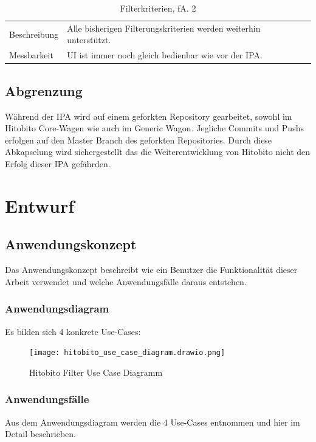 \begin{table}[h!]
   \begin{tabular}{|L{0.3\textwidth}|L{0.6\textwidth}|}
       \hline
         \\[4pt]
       \hline
       Beschreibung & Alle bisherigen Filterungskriterien werden weiterhin unterstützt. \\
       \hline
       Messbarkeit & UI ist immer noch gleich bedienbar wie vor der IPA.  \\
       \hline
     \end{tabular}
     \caption{Filterkriterien, fA. 2}
\end{table}

\section{Abgrenzung}

Während der IPA wird auf einem geforkten Repository gearbeitet, sowohl im Hitobito Core-Wagen wie auch
im Generic Wagon. Jegliche Commits und Pushs erfolgen auf den Master Branch des geforkten Repositories. Durch diese 
Abkapselung wird sichergestellt das die Weiterentwicklung von Hitobito nicht den Erfolg dieser IPA gefährden. 
 
\chapter{Entwurf}
\section{Anwendungskonzept}
Das Anwendungskonzept beschreibt wie ein Benutzer die Funktionalität dieser Arbeit verwendet und welche Anwendungsfälle
daraus entstehen.


\subsection{Anwendungsdiagram}
Es bilden sich 4 konkrete Use-Cases:
\begin{figure}[h]
   \centering
   \texttt{[image: hitobito\_use\_case\_diagram.drawio.png]}
   \caption{Hitobito Filter Use Case Diagramm}
\end{figure}


\subsection{Anwendungsfälle}
Aus dem Anwendungsdiagram werden die 4 Use-Cases entnommen und hier im Detail beschrieben.

